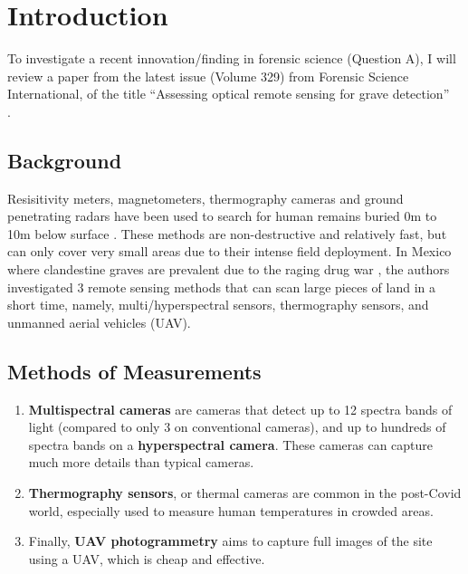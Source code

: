 \documentclass[12pt]{article}
\title{\mytitle}
\author{\myname}
\date{\today}
\theoremstyle{plain}
\begin{document}
\maketitle
\section{Introduction}
To investigate a recent innovation/finding in forensic science (Question A), I
will review a paper from the latest issue (Volume 329) from Forensic Science
International, of the title ``Assessing optical remote sensing for grave
detection''\\
\cite{SILVANCARDENAS2021111064}.



\subsection{Background}
\label{subsec:background}
Resisitivity meters, magnetometers, thermography cameras and ground penetrating
radars have been used to search for human remains buried 0m to 10m below surface
\cite{SILVANCARDENAS2021111064}. These methods are non-destructive and
relatively fast, but can only cover very small areas due to their intense field
deployment. In Mexico where clandestine graves are prevalent due to the raging
drug war \cite{reuters_2020}, the authors investigated 3 remote sensing methods
that can scan large pieces of land in a short time, namely, multi/hyperspectral
sensors, thermography sensors, and unmanned aerial vehicles (UAV).

\subsection{Methods of Measurements}
\label{subsec:methods}
\begin{enumerate}
  \item \textbf{Multispectral cameras }are cameras that detect up to 12 spectra
        bands of light (compared to only 3 on conventional cameras), and up to
        hundreds of spectra bands on a \textbf{hyperspectral camera}. These
        cameras can capture much more details than typical cameras.
  \item \textbf{Thermography sensors}, or thermal cameras are common in the
        post-Covid world, especially used to measure human temperatures in
        crowded areas.
  \item Finally, \textbf{UAV photogrammetry} aims to capture full images of the
        site using a UAV, which is cheap and effective.
\end{enumerate}
\end{document}
